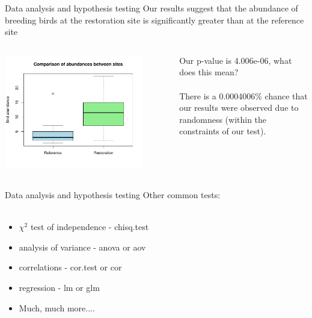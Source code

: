 \documentclass[xcolor=svgnames]{beamer}
\begin{document}
\begin{frame}{Data analysis and hypothesis testing}
Our results suggest that the abundance of breeding birds at the restoration site is significantly greater than at the reference site
\vspace{0.5in}
\begin{columns}
\begin{column}{0.5\textwidth}
\centerline{\includegraphics[width=0.85\textwidth,trim=0in 1in 0.5in 0.5in]{R_for_data_analysis-box2.pdf}}
\end{column}
\begin{column}{0.5\textwidth}
Our p-value is 4.006e-06, what does this mean?\\~\\ 
There is a 0.0004006\% chance that our results were observed due to randomness (within the constraints of our test).
\end{column}
\end{columns}
\end{frame}

\begin{frame}[t]{Data analysis and hypothesis testing}
Other common tests:\\~\\
\begin{itemize}
\itemsep20pt
\item $\chi^2$ test of independence - chisq.test
\item analysis of variance - anova or aov
\item correlations - cor.test or cor
\item regression - lm or glm 
\item Much, much more....
\end{itemize}
\end{frame}
\end{document}
